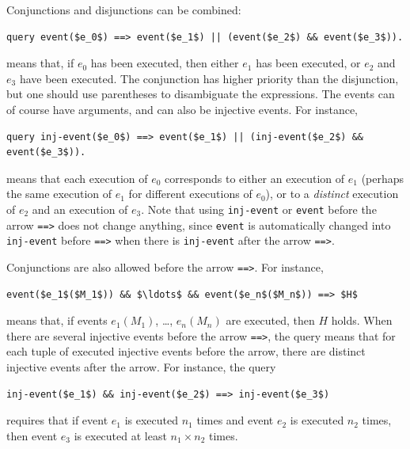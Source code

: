 \documentclass{book}
\begin{document}
Conjunctions and disjunctions can be combined:
\begin{lstlisting}[numbers=none]
	query event($e_0$) ==> event($e_1$) || (event($e_2$) && event($e_3$)).
\end{lstlisting}
means that, if $e_0$ has been executed, then either $e_1$ has been
executed, or $e_2$ and $e_3$ have been executed. The conjunction has
higher priority than the disjunction, but one should use
parentheses to disambiguate the expressions. The events can of course
have arguments, and can also be injective events. For instance,
\begin{lstlisting}[numbers=none]
	query inj-event($e_0$) ==> event($e_1$) || (inj-event($e_2$) && event($e_3$)).
\end{lstlisting}
means that each execution of $e_0$ corresponds to either an execution of $e_1$
(perhaps the same execution of $e_1$ for different executions of $e_0$),
or to a \emph{distinct} execution of $e_2$ and an execution of $e_3$.
Note that using \lstinline!inj-event! or \lstinline!event! before the arrow
\lstinline!==>! does not change anything, since \lstinline!event! is
automatically changed into \lstinline!inj-event! before \lstinline!==>!
when there is \lstinline!inj-event! after the arrow \lstinline!==>!.

Conjunctions are also allowed before the arrow \lstinline!==>!. For instance,
\begin{lstlisting}[numbers=none]
	event($e_1$($M_1$)) && $\ldots$ && event($e_n$($M_n$)) ==> $H$
\end{lstlisting}
means that, if events $e_1(M_1)$, \dots, $e_n(M_n)$ are executed, then $H$ holds.
When there are several injective events before the arrow \lstinline!==>!,
the query means that for each tuple of executed injective events before the arrow,
there are distinct injective events after the arrow. For instance,
the query
\begin{lstlisting}[numbers=none]
	inj-event($e_1$) && inj-event($e_2$) ==> inj-event($e_3$)
\end{lstlisting}
requires that if event $e_1$ is executed $n_1$ times
and event $e_2$ is executed $n_2$ times, then event $e_3$
is executed at least $n_1 \times n_2$ times.
\end{document}
